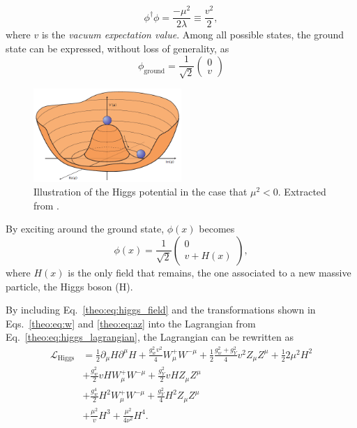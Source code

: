 \documentclass[../main.tex]{subfiles}
\begin{document}
\begin{equation}
\phi^\dagger\phi = \frac{-\mu^2}{2\lambda} \equiv \frac{v^2}{2},
\end{equation}
where $v$ is the \textit{vacuum expectation value}. Among all possible states, the ground state can be expressed, without loss of generality, as
\begin{equation}
\phi_\text{ground} = \frac{1}{\sqrt{2}}\left(
\begin{matrix}
0 \\
v
\end{matrix}
\right)
\end{equation}

\begin{figure}[h!]
\begin{center}
\includegraphics[width=0.5\textwidth]{Images/higgspotential}
\end{center}
\caption{Illustration of the Higgs potential in the case that $\mu^2 < 0$. Extracted from \cite{intro:theo:higgs_potential_picture}.}
\label{theo:fig:higgs_potential}
\end{figure}

By exciting around the ground state, $\phi(x)$ becomes
\begin{equation}
\label{theo:eq:higgs_field}
\phi(x) = \frac{1}{\sqrt{2}}
\left(
\begin{matrix}
0 \\
v + H(x)
\end{matrix}
\right),
\end{equation}
where $H(x)$ is the only field that remains, the one associated to a new massive particle, the Higgs boson (H).

By including Eq.~\ref{theo:eq:higgs_field} and the transformations shown in Eqs.~\ref{theo:eq:w} and \ref{theo:eq:az} into the Lagrangian from Eq.~\ref{theo:eq:higgs_lagrangian}, the Lagrangian can be rewritten as
\begin{align}
\label{theo:eq:boson_masses}
\mathcal{L}_{\text{Higgs}} &= \frac{1}{2}\partial_\mu H \partial^\mu H + \frac{g_w^2 v^2}{4}W_\mu^+ W^{-\mu} + \frac{1}{2}\frac{g_w^2 + g_Y^2}{4}v^2 Z_\mu Z^\mu + \frac{1}{2}2\mu^2H^2 \\
\label{theo:eq:vvh}
&+ \frac{g_w^2}{2}vHW_\mu^+W^{-\mu} + \frac{g_Y^2}{2}vHZ_\mu Z^\mu\\
\label{theo:eq:vvhh}
&+ \frac{g_w^4}{2}H^2W_\mu^+W^{-\mu} + \frac{g_Y^2}{4}H^2Z_\mu Z^\mu\\
\label{theo:eq:hh}
&+ \frac{\mu^2}{v}H^3 + \frac{\mu^2}{4\nu^2}H^4.
\end{align}
\end{document}
